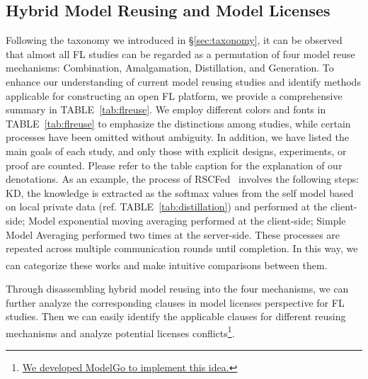 
\subsection{Hybrid Model Reusing and Model Licenses}
\label{sec:hybrid}
Following the taxonomy we introduced in \S\ref{sec:taxonomy}, it can be observed that almost all FL studies can be regarded as a permutation of four model reuse mechanisms: Combination, Amalgamation, Distillation, and Generation.
To enhance our understanding of current model reusing studies and identify methods applicable for constructing an open FL platform, we provide a comprehensive summary in TABLE~\ref{tab:flreuse}.
We employ different colors and fonts in TABLE~\ref{tab:flreuse} to emphasize the distinctions among studies, while certain processes have been omitted without ambiguity.
In addition, we have listed the main goals of each study, and only those with explicit designs, experiments, or proof are counted.
Please refer to the table caption for the explanation of our denotations.
As an example, the process of RSCFed~\cite{liang2022rscfed} involves the following steps: 
 KD, the knowledge is extracted as the softmax values from the self model based on local private data (ref. TABLE~\ref{tab:distillation}) and performed at the client-side;
 Model exponential moving averaging performed at the client-side;
 Simple Model Averaging performed two times at the server-side.
These processes are repeated across multiple communication rounds until completion.
In this way, we can categorize these works and make intuitive comparisons between them\textsuperscript{}.

Through disassembling hybrid model reusing into the four mechanisms, we can further analyze the corresponding clauses in model licenses perspective for FL studies.
Then we can easily identify the applicable clauses for different reusing mechanisms\textsuperscript{} and analyze potential licenses conflicts\footnote{\href{https://github.com/Xtra-Computing/ModelGo}{We developed ModelGo to implement this idea.}}.

